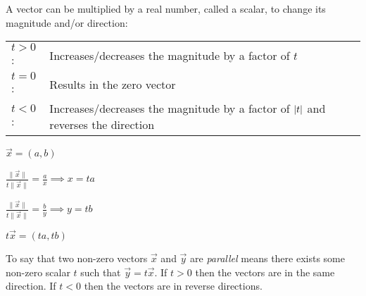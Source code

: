 \documentclass[letterpaper,12pt,fleqn]{article}
\newcommand{\vx}{\vec{x}}
\newcommand{\vy}{\vec{y}}
\newcommand{\norm}[1]{\|#1\|}
\begin{document}
A vector can be multiplied by a real number, called a scalar, to change its
magnitude and/or direction:

\begin{center}
  \begin{tabular}{ll}
    $t>0$: & Increases/decreases the magnitude by a factor of $t$ \\
    $t=0$: & Results in the zero vector \\
    $t<0$: & Increases/decreases the magnitude by a factor of $\lvert t\rvert$ and
    reverses the direction \\
  \end{tabular}
\end{center}

\bigskip

\begin{minipage}{4in}
  \begin{center}
  \end{center}
\end{minipage}
\begin{minipage}{3in}
  $\vx=(a,b)$

  \bigskip
  
  $\frac{\norm{\vx}}{t\norm{\vx}}=\frac{a}{x}\implies x=ta$

  \bigskip
    
  $\frac{\norm{\vx}}{t\norm{\vx}}=\frac{b}{y}\implies y=tb$

  \bigskip

  $t\vx=(ta,tb)$
\end{minipage}

\begin{definition}
  To say that two non-zero vectors $\vx$ and $\vy$ are \emph{parallel} means
  there exists some non-zero scalar $t$ such that $\vy=t\vx$. If $t>0$ then
  the vectors are in the same direction. If $t<0$ then the vectors are in
  reverse directions.
\end{definition}
\end{document}

